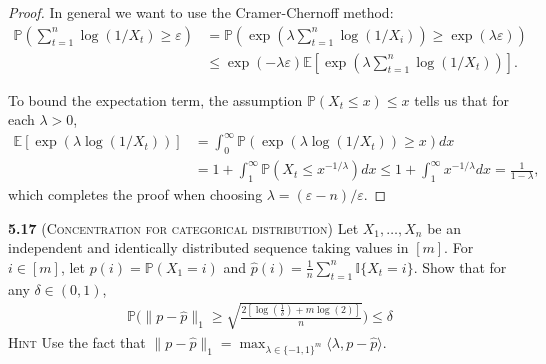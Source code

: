 \begin{proof}
	In general we want to use the Cramer-Chernoff method:
	\begin{equation*}
		\begin{aligned}
			\mathbb{P}\left(\sum_{t=1}^{n} \log \left(1 / X_{t}\right) \geq \varepsilon\right)
			&=\mathbb{P}\left(\exp \left(\lambda \sum_{t=1}^{n} \log \left(1 / X_{i}\right)\right) \geq \exp (\lambda \varepsilon)\right)\\
			&\leq \exp (-\lambda \varepsilon) \mathbb{E}\left[\exp \left(\lambda \sum_{t=1}^{n} \log \left(1 / X_{t}\right)\right)\right].
		\end{aligned}
	\end{equation*}

	To bound the expectation term, the assumption $\mathbb{P}\left(X_{t} \leq x\right) \leq x$ tells us that for each $\lambda > 0$,
	\begin{equation*}
		\begin{aligned}
			\mathbb{E}\left[\exp \left(\lambda \log \left(1 / X_{t}\right)\right)\right]
			&=\int_{0}^{\infty} \mathbb{P}\left(\exp \left(\lambda \log \left(1 / X_{t}\right)\right) \geq x\right) d x\\
			&=1+\int_{1}^{\infty} \mathbb{P}\left(X_{t} \leq x^{-1 / \lambda}\right) d x \leq 1+\int_{1}^{\infty} x^{-1 / \lambda} d x=\frac{1}{1-\lambda},
		\end{aligned}
	\end{equation*}
	which completes the proof when choosing $\lambda=(\varepsilon-n) / \varepsilon$.
\end{proof}

\noindent \textbf{5.17} (\textsc{Concentration for categorical distribution}) Let $X_{1}, \ldots, X_{n}$ be an independent and identically distributed sequence taking values in $[m]$. For $i\in [m]$, let $p(i)=\mathbb{P}(X_1 =i)$ and $\hat{p}(i)=\frac{1}{n}\sum_{t=1}^n\mathbb{I}\{X_t=i\}$. Show that for any $\delta\in(0,1)$,
\begin{align*}
    \mathbb{P}\bigg(\|p-\hat{p}\|_1\ge \sqrt{\frac{2[\log(\frac{1}{\delta})+m\log(2)]}{n}}\bigg)\leq \delta
\end{align*}
\textsc{Hint} Use the fact that $\|p-\hat{p}\|_1 = \max_{\lambda\in\{-1,1\}^m}\langle\lambda,p-\hat{p}\rangle$.


